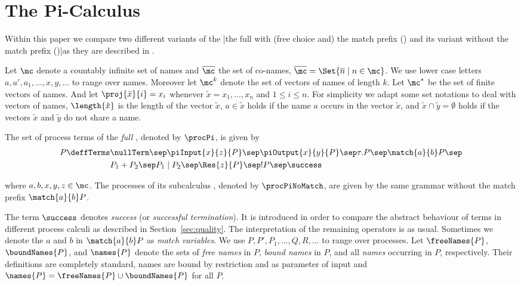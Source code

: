 \documentclass[final,copyright,creativecommons]{eptcs}
\begin{document}
\section{The Pi-Calculus}
\label{sec:processCalculi}

Within this paper we compare two different variants of the \piCal|the full \piCal with (free choice and) the match prefix (\piT) and its variant without the match prefix (\piNM)|as they are described \eg in \cite{milnerParrowWalker92,Milner1999}.

Let $ \mc $ denote a countably infinite set of names and $ \overline{\mc} $ the set of co-names, \ie $ \overline{\mc} = \Set{ \overline{n} \mid n \in \mc } $. We use lower case letters $ a, a', a_1, \ldots, x, y, \ldots $ to range over names.
Moreover let $ \mc^k $ denote the set of vectors of names of length $ k $. Let $ \mc^* $ be the set of finite vectors of names. And let $ \proj{\tilde{x}}{i} = x_i $ whenever $ \tilde{x} = x_1, \ldots, x_n $ and $ 1 \leq i \leq n $.
For simplicity we adapt some set notations to deal with vectors of names, \eg $ \length{\tilde{x}} $ is the length of the vector $ \tilde{x} $, $ a \in \tilde{x} $ holds if the name $ a $ occurs in the vector $ \tilde{x} $, and $ \tilde{x} \cap \tilde{y} = \emptyset $ holds if the vectors $ \tilde{x} $ and $ \tilde{y} $ do not share a name.

\begin{definition}[Syntax]
	The set of process terms of the \emph{full \piCal}, denoted by $ \procPi $, is given by
	\begin{align*}
		P \deffTerms & \nullTerm \sep \piInput{x}{z}{P} \sep \piOutput{x}{y}{P} \sep \tau.P \sep \match{a}{b}P \sep\\
		& P_1 + P_2 \sep P_1 \mid P_2 \sep \Res{z}{P} \sep !P \sep \success
	\end{align*}
	
	\noindent
	where $ a, b, x, y, z \in \mc $.
	The processes of its subcalculus \piNM, denoted by $ \procPiNoMatch $, are given by the same grammar without the match prefix $ \match{a}{b}P $.
\end{definition}

\noindent
The term $ \success $ denotes \emph{success} (or \emph{successful termination}). It is introduced in order to compare the abstract behaviour of terms in different process calculi as described in Section~\ref{sec:quality}.
The interpretation of the remaining operators is as usual.
Sometimes we denote the $ a $ and $ b $ in $ \match{a}{b}P $ as \emph{match variables}.
We use $ P, P', P_1, \ldots, Q, R, \ldots $ to range over processes. Let $ \freeNames{P} $, $ \boundNames{P} $, and $ \names{P} $ denote the sets of \emph{free names} in $ P $, \emph{bound names} in $ P $, and all \emph{names} occurring in $ P $, respectively. Their definitions are completely standard, \ie names are bound by restriction and as parameter of input and $ \names{P} = \freeNames{P} \cup \boundNames{P} $ for all $ P $.
\end{document}
